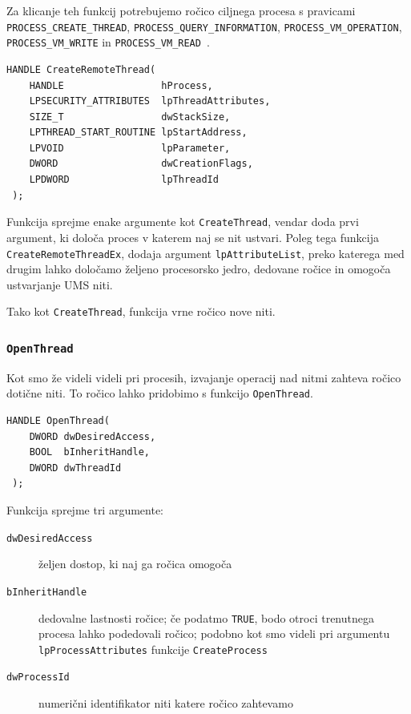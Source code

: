 \documentclass[a4paper,12pt,openright]{book}
\begin{document}
Za klicanje teh funkcij potrebujemo ročico ciljnega procesa s pravicami \texttt{PROCESS\_CREATE\_THREAD}, \texttt{PROCESS\_QUERY\_INFORMATION}, \texttt{PROCESS\_VM\_OPERATION}, \texttt{PROCESS\_VM\_WRITE} in \texttt{PROCESS\_VM\_READ }.

\begin{lstlisting}[style=func]
 HANDLE CreateRemoteThread(
	HANDLE                 hProcess,
	LPSECURITY_ATTRIBUTES  lpThreadAttributes,
	SIZE_T                 dwStackSize,
	LPTHREAD_START_ROUTINE lpStartAddress,
	LPVOID                 lpParameter,
	DWORD                  dwCreationFlags,
	LPDWORD                lpThreadId
 );
\end{lstlisting}

Funkcija sprejme enake argumente kot \texttt{CreateThread}, vendar doda prvi argument, ki določa proces v katerem naj se nit ustvari.
Poleg tega funkcija \texttt{CreateRemoteThreadEx}, dodaja argument \texttt{lpAttributeList}, preko katerega med drugim lahko določamo željeno procesorsko jedro, dedovane ročice in omogoča ustvarjanje UMS niti.

Tako kot \texttt{CreateThread}, funkcija vrne ročico nove niti.

\subsubsection{\texttt{OpenThread}}

Kot smo že videli videli pri procesih, izvajanje operacij nad nitmi zahteva ročico dotične niti.
To ročico lahko pridobimo s funkcijo \texttt{OpenThread}.

\begin{lstlisting}[style=func]
 HANDLE OpenThread(
	DWORD dwDesiredAccess,
	BOOL  bInheritHandle,
	DWORD dwThreadId
 );
\end{lstlisting}

Funkcija sprejme tri argumente:
\begin{description}
	\item[\texttt{dwDesiredAccess}] željen dostop, ki naj ga ročica omogoča
	\item[\texttt{bInheritHandle}] dedovalne lastnosti ročice; če podatmo \texttt{TRUE}, bodo otroci trenutnega procesa lahko podedovali ročico; podobno kot smo videli pri argumentu \texttt{lpProcessAttributes} funkcije \texttt{CreateProcess}
	\item[\texttt{dwProcessId}] numerični identifikator niti katere ročico zahtevamo
\end{description}
\end{document}
